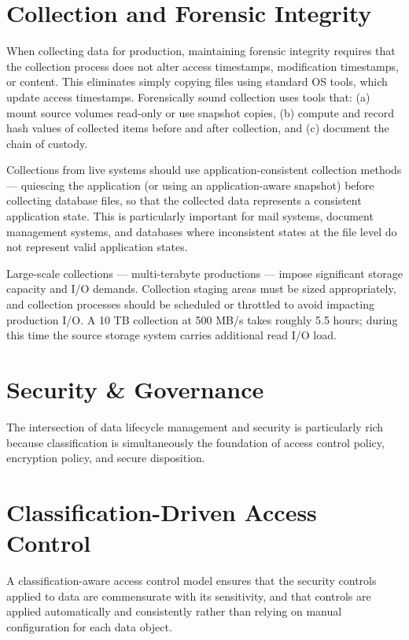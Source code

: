 \section{Collection and Forensic Integrity}
When collecting data for production, maintaining forensic integrity requires that the collection process does not alter access timestamps, modification timestamps, or content. This eliminates simply copying files using standard OS tools, which update access timestamps. Forensically sound collection uses tools that: (a) mount source volumes read-only or use snapshot copies, (b) compute and record hash values of collected items before and after collection, and (c) document the chain of custody.

Collections from live systems should use application-consistent collection methods --- quiescing the application (or using an application-aware snapshot) before collecting database files, so that the collected data represents a consistent application state. This is particularly important for mail systems, document management systems, and databases where inconsistent states at the file level do not represent valid application states.

Large-scale collections --- multi-terabyte productions --- impose significant storage capacity and I/O demands. Collection staging areas must be sized appropriately, and collection processes should be scheduled or throttled to avoid impacting production I/O. A 10 TB collection at 500 MB/s takes roughly 5.5 hours; during this time the source storage system carries additional read I/O load.

\section{Security \& Governance}
The intersection of data lifecycle management and security is particularly rich because classification is simultaneously the foundation of access control policy, encryption policy, and secure disposition.

\section{Classification-Driven Access Control}
A classification-aware access control model ensures that the security controls applied to data are commensurate with its sensitivity, and that controls are applied automatically and consistently rather than relying on manual configuration for each data object.

